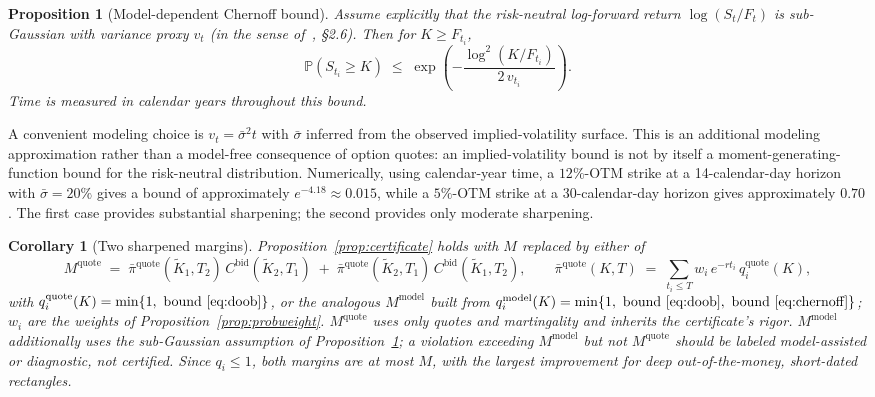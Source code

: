 \documentclass[11pt]{article}
\newtheorem{proposition}{Proposition}
\newtheorem{corollary}{Corollary}
\theoremstyle{remark}
\newcommand{\Prob}{\mathbb{P}}
\newcommand{\Kt}[1]{\tilde K_{#1}}
\begin{document}
\begin{proposition}[Model-dependent Chernoff bound]\label{prop:chernoff}
Assume explicitly that the risk-neutral log-forward return $\log(S_t/F_t)$ is sub-Gaussian with variance proxy $v_t$ (in the sense of~\cite{vershynin}, \S2.6). Then for $K\ge F_{t_i}$,
\begin{equation}
\Prob(S_{t_i}\ge K)\;\le\;\exp\!\left(-\frac{\log^2(K/F_{t_i})}{2\,v_{t_i}}\right).
\label{eq:chernoff}
\end{equation}
Time is measured in calendar years throughout this bound.
\end{proposition}
\noindent A convenient modeling choice is $v_t=\bar\sigma^2 t$ with $\bar\sigma$ inferred from the observed implied-volatility surface. This is an additional modeling approximation rather than a model-free consequence of option quotes: an implied-volatility bound is not by itself a moment-generating-function bound for the risk-neutral distribution. Numerically, using calendar-year time, a $12\%$-OTM strike at a 14-calendar-day horizon with $\bar\sigma=20\%$ gives a bound of approximately $e^{-4.18}\approx0.015$, while a $5\%$-OTM strike at a 30-calendar-day horizon gives approximately $0.70$. The first case provides substantial sharpening; the second provides only moderate sharpening.

\begin{corollary}[Two sharpened margins]\label{cor:sharpcert}
Proposition~\ref{prop:certificate} holds with $M$ replaced by either of
\[
M^{\mathrm{quote}}\;=\;\bar\pi^{\mathrm{quote}}(\Kt1,T_2)\,C^{\mathrm{bid}}(\Kt2,T_1)\;+\;\bar\pi^{\mathrm{quote}}(\Kt2,T_1)\,C^{\mathrm{bid}}(\Kt1,T_2),
\qquad
\bar\pi^{\mathrm{quote}}(K,T)\;=\;\sum_{t_i\le T} w_i\,e^{-rt_i}\,q_i^{\mathrm{quote}}(K),
\]
with $q_i^{\mathrm{quote}}(K)=\min\{1,\ \text{bound \eqref{eq:doob}}\}$, or the analogous $M^{\mathrm{model}}$ built from $q_i^{\mathrm{model}}(K)=\min\{1,\ \text{bound \eqref{eq:doob}},\ \text{bound \eqref{eq:chernoff}}\}$; $w_i$ are the weights of Proposition~\ref{prop:probweight}. $M^{\mathrm{quote}}$ uses only quotes and martingality and inherits the certificate's rigor. $M^{\mathrm{model}}$ additionally uses the sub-Gaussian assumption of Proposition~\ref{prop:chernoff}; a violation exceeding $M^{\mathrm{model}}$ but not $M^{\mathrm{quote}}$ should be labeled model-assisted or diagnostic, not certified. Since $q_i\le1$, both margins are at most $M$, with the largest improvement for deep out-of-the-money, short-dated rectangles.
\end{corollary}
\end{document}
